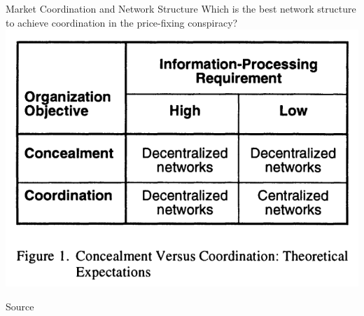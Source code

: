 \documentclass[notes, aspectratio=1610]{beamer}
\begin{document}
\begin{frame}{Market Coordination and Network Structure}
	{Which is the best network structure to achieve coordination in the price-fixing conspiracy?}
	\centering
	\includegraphics[height=.8\textheight]{images/two_by_two.png}

	\raggedleft Source~\cite[][page 845]{baker_faulkner_1993}
\end{frame}
\end{document}
